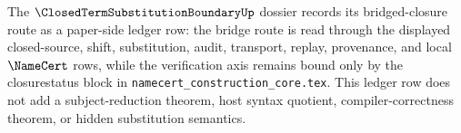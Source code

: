 The $\ClosedTermSubstitutionBoundaryUp$ dossier records its bridged-closure route as a paper-side ledger row: the bridge route is read through the displayed closed-source, shift, substitution, audit, transport, replay, provenance, and local $\NameCert$ rows, while the verification axis remains bound only by the closurestatus block in \texttt{namecert\_construction\_core.tex}. This ledger row does not add a subject-reduction theorem, host syntax quotient, compiler-correctness theorem, or hidden substitution semantics.
